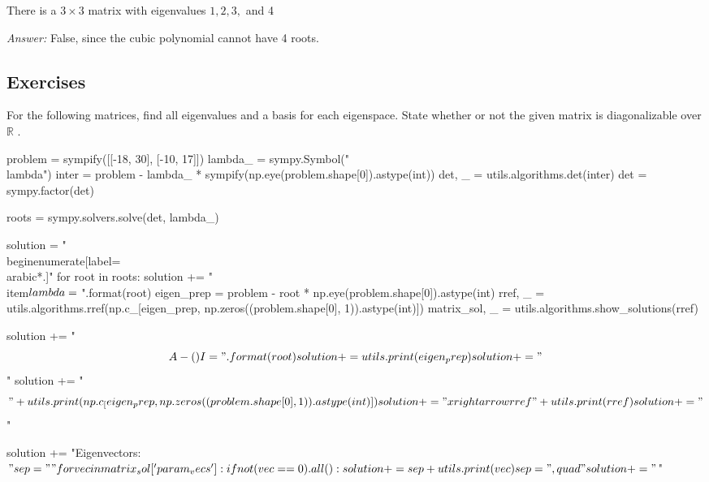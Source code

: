 \documentclass[letterpaper]{article}
\newcommand{\ans}{\textit{Answer: }}
\newenvironment{question}[2][Question]{\begin{trivlist}
\item[\hskip \labelsep {\bfseries #1}\hskip \labelsep {\bfseries #2.}]}{\end{trivlist}}
\begin{document}
\begin{question}{5.11}
  There is a $3 \times 3$ matrix with eigenvalues $1,2,3,$ and 4

  \ans False, since the cubic polynomial cannot have 4 roots.
  
\end{question}

\subsection{Exercises}

\begin{question}{5.5}
  For the following matrices, find all eigenvalues and a basis for each eigenspace.
  State whether or not the given matrix is diagonalizable over $\mathbb{R}$ .

  \begin{enumerate}[label=\textbf{(\alph*)}]
    \begin{pycode}
problem = sympify([[-18, 30], [-10, 17]])
lambda_ = sympy.Symbol("\\lambda")
inter = problem - lambda_ * sympify(np.eye(problem.shape[0]).astype(int))
det, _ = utils.algorithms.det(inter)
det = sympy.factor(det)

roots = sympy.solvers.solve(det, lambda_)

solution = "\\begin{enumerate}[label=\\arabic*.]\n"
for root in roots:
  solution += "\\item$\\lambda = {}$\n".format(root)
  eigen_prep = problem - root * np.eye(problem.shape[0]).astype(int)
  rref, _ = utils.algorithms.rref(np.c_[eigen_prep, np.zeros((problem.shape[0], 1)).astype(int)])
  matrix_sol, _ = utils.algorithms.show_solutions(rref)

  solution += "$$A - ({}) I = ".format(root)
  solution += utils.print(eigen_prep)
  solution += "$$\n"
  solution += "$$" + utils.print(np.c_[eigen_prep, np.zeros((problem.shape[0], 1)).astype(int)])
  solution += "\\xrightarrow{rref}" + utils.print(rref)
  solution += "$$\n"

  solution += "Eigenvectors: $"

  sep = ""
  for vec in matrix_sol['param_vecs']:
    if not (vec == 0).all():
      solution += sep + utils.print(vec)
      sep = ",\\quad"

  solution += "$\n"


\end{pycode}
\end{enumerate}
\end{question}
\end{document}
